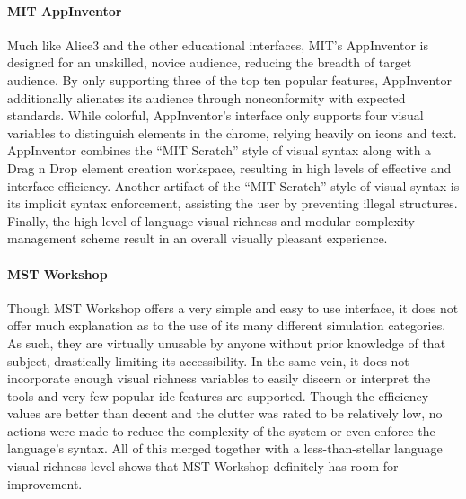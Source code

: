 \paragraph{MIT AppInventor} Much like Alice3 and the other educational
interfaces, MIT's AppInventor is designed for an unskilled, novice
audience, reducing the breadth of target audience. By only supporting three
of the top ten popular features, AppInventor additionally alienates its
audience through nonconformity with expected standards. While colorful,
AppInventor's interface only supports four visual variables to distinguish
elements in the chrome, relying heavily on icons and text. AppInventor
combines the ``MIT Scratch'' style of visual syntax along with a Drag n
Drop element creation workspace, resulting in high levels of effective and
interface efficiency. Another artifact of the ``MIT Scratch'' style of
visual syntax is its implicit syntax enforcement, assisting the user by
preventing illegal structures. Finally, the high level of language visual
richness and modular complexity management scheme result in an overall
visually pleasant experience.

\paragraph{MST Workshop} Though MST Workshop offers a very simple and easy
to use interface, it does not offer much explanation as to the use of its
many different simulation categories. As such, they are virtually unusable
by anyone without prior knowledge of that subject, drastically limiting its
accessibility. In the same vein, it does not incorporate enough visual
richness variables to easily discern or interpret the tools and very few
popular \ac{ide} features are supported. Though the efficiency values are
better than decent and the clutter was rated to be relatively low, no
actions were made to reduce the complexity of the system or even enforce
the language's syntax. All of this merged together with a less-than-stellar
language visual richness level shows that MST Workshop definitely has room
for improvement.


